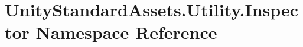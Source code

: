 \hypertarget{namespace_unity_standard_assets_1_1_utility_1_1_inspector}{}\section{Unity\+Standard\+Assets.\+Utility.\+Inspector Namespace Reference}
\label{namespace_unity_standard_assets_1_1_utility_1_1_inspector}
